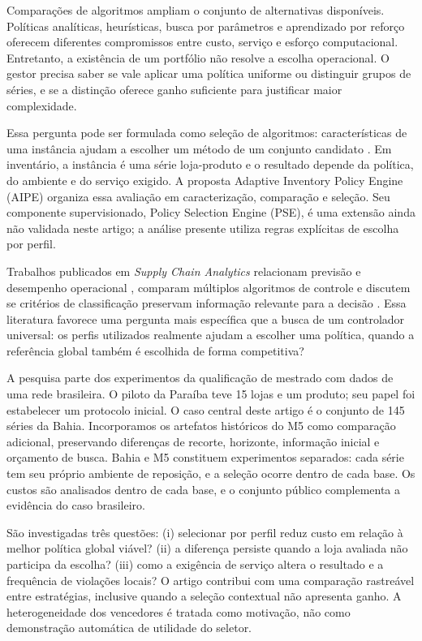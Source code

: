 \documentclass[preprint,12pt]{elsarticle}
\begin{document}
Comparações de algoritmos ampliam o conjunto de alternativas disponíveis. Políticas analíticas, heurísticas, busca por parâmetros e aprendizado por reforço oferecem diferentes compromissos entre custo, serviço e esforço computacional. Entretanto, a existência de um portfólio não resolve a escolha operacional. O gestor precisa saber se vale aplicar uma política uniforme ou distinguir grupos de séries, e se a distinção oferece ganho suficiente para justificar maior complexidade.

Essa pergunta pode ser formulada como seleção de algoritmos: características de uma instância ajudam a escolher um método de um conjunto candidato \cite{rice1976,Kotthoff2014AlgorithmSelection}. Em inventário, a instância é uma série loja-produto e o resultado depende da política, do ambiente e do serviço exigido. A proposta Adaptive Inventory Policy Engine (AIPE) organiza essa avaliação em caracterização, comparação e seleção. Seu componente supervisionado, Policy Selection Engine (PSE), é uma extensão ainda não validada neste artigo; a análise presente utiliza regras explícitas de escolha por perfil.

Trabalhos publicados em \textit{Supply Chain Analytics} relacionam previsão e desempenho operacional \cite{sca_f81ad2b3e023}, comparam múltiplos algoritmos de controle \cite{sca_27e994c54848} e discutem se critérios de classificação preservam informação relevante para a decisão \cite{sca_c5c06dcbc9e5}. Essa literatura favorece uma pergunta mais específica que a busca de um controlador universal: os perfis utilizados realmente ajudam a escolher uma política, quando a referência global também é escolhida de forma competitiva?

A pesquisa parte dos experimentos da qualificação de mestrado com dados de uma rede brasileira. O piloto da Paraíba teve 15 lojas e um produto; seu papel foi estabelecer um protocolo inicial. O caso central deste artigo é o conjunto de 145 séries da Bahia. Incorporamos os artefatos históricos do M5 como comparação adicional, preservando diferenças de recorte, horizonte, informação inicial e orçamento de busca. Bahia e M5 constituem experimentos separados: cada série tem seu próprio ambiente de reposição, e a seleção ocorre dentro de cada base. Os custos são analisados dentro de cada base, e o conjunto público complementa a evidência do caso brasileiro.

São investigadas três questões: (i) selecionar por perfil reduz custo em relação à melhor política global viável? (ii) a diferença persiste quando a loja avaliada não participa da escolha? (iii) como a exigência de serviço altera o resultado e a frequência de violações locais? O artigo contribui com uma comparação rastreável entre estratégias, inclusive quando a seleção contextual não apresenta ganho. A heterogeneidade dos vencedores é tratada como motivação, não como demonstração automática de utilidade do seletor.
\end{document}
